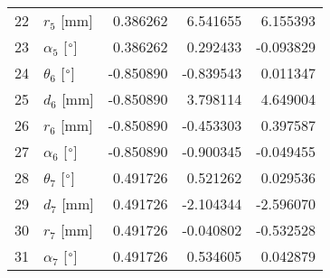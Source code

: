 \documentclass{standalone}%
\begin{document}
\begin{tabular}{llrrr}
22 &              $r_{5}$ [mm] &  0.386262 &   6.541655 &   6.155393 \\
23 &  $\alpha_{5}$ [$\degree$] &  0.386262 &   0.292433 &  -0.093829 \\
24 &  $\theta_{6}$ [$\degree$] & -0.850890 &  -0.839543 &   0.011347 \\
25 &              $d_{6}$ [mm] & -0.850890 &   3.798114 &   4.649004 \\
26 &              $r_{6}$ [mm] & -0.850890 &  -0.453303 &   0.397587 \\
27 &  $\alpha_{6}$ [$\degree$] & -0.850890 &  -0.900345 &  -0.049455 \\
28 &  $\theta_{7}$ [$\degree$] &  0.491726 &   0.521262 &   0.029536 \\
29 &              $d_{7}$ [mm] &  0.491726 &  -2.104344 &  -2.596070 \\
30 &              $r_{7}$ [mm] &  0.491726 &  -0.040802 &  -0.532528 \\
31 &  $\alpha_{7}$ [$\degree$] &  0.491726 &   0.534605 &   0.042879 \\
\bottomrule
\end{tabular}
%
\end{document}
